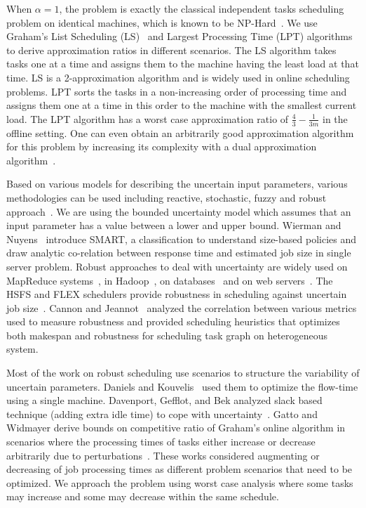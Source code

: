 \documentclass[twocolumn]{svjour3}
\begin{document}
When $\alpha = 1$, the problem is exactly the classical independent
tasks scheduling problem on identical machines, which is known to be
NP-Hard~\cite{GareyJohnson79}. We use Graham's List Scheduling
(LS)~\cite{Graham66} and Largest Processing Time (LPT)
algorithms~\cite{Graham69boundson} to derive approximation ratios in
different scenarios. The LS algorithm takes tasks one at a time and
assigns them to the machine having the least load at that time. LS is a
2-approximation algorithm and is widely used in online scheduling
problems. LPT sorts the tasks in a non-increasing order of processing time and
assigns them one at a time in this order to the machine with the
smallest current load. The LPT algorithm has a worst case approximation
ratio of $\frac{4}{3}-\frac{1}{3m}$ in the offline setting. One can
even obtain an arbitrarily good approximation algorithm for this problem by increasing
its complexity with a dual approximation
algorithm~\cite{Hoch87}.


Based on various models for describing the uncertain input parameters,
various methodologies can be used including reactive, stochastic,
fuzzy and robust approach~\cite{DBLP:journals/cce/LiI08}. We are using
the bounded uncertainty model which assumes that an input parameter
has a value between a lower and upper bound.  Wierman and
Nuyens~\cite{conf/sigmetrics/WiermanN08} introduce SMART, a
classification to understand size-based policies and draw analytic
co-relation between response time and estimated job size in single
server problem. Robust approaches to deal with uncertainty are widely
used on MapReduce
systems~\cite{Kavulya:2010:ATP:1844765.1845224,Verma:2011:AAR:1998582.1998637},
in
Hadoop~\cite{Wolf:2010:FSA:2023718.2023720,White:2009:HDG:1717298},
on databases~\cite{Lipton199518} and on web
servers~\cite{Cardellini99dynamicload}. The HSFS and FLEX schedulers
provide robustness in scheduling against uncertain job
size~\cite{Wolf:2010:FSA:2023718.2023720,6691554}. Cannon and
Jeannot~\cite{cj09c} analyzed the correlation between various metrics
used to measure robustness and provided scheduling heuristics that
optimizes both makespan and robustness for scheduling task graph on
heterogeneous system.

Most of the work on robust scheduling use scenarios to structure
the variability of uncertain parameters. Daniels and
Kouvelis~\cite{citeulike:8334169} used them to optimize the flow-time
using a single machine. Davenport, Gefflot, and Bek analyzed slack
based technique (adding extra idle time) to cope with
uncertainty~\cite{Davenport_slack-basedtechniques}. Gatto and Widmayer
derive bounds on competitive ratio of Graham’s online algorithm in
scenarios where the processing times of tasks either increase or decrease
arbitrarily due to perturbations~\cite{Gatto07}.  These works
considered augmenting or decreasing of job processing times as
different problem scenarios that need to be optimized. We 
approach the problem using worst case analysis where some tasks may
increase and some may decrease within the same schedule.
  
\end{document}
